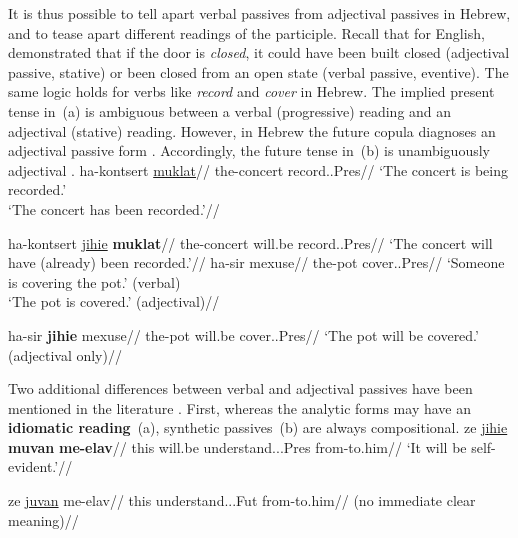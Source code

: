 It is thus possible to tell apart verbal passives from adjectival passives in Hebrew, and to tease apart different readings of the participle. Recall that for English, \cite{embick04li} demonstrated that if the door is \emph{closed}, it could have been built closed (adjectival passive, stative) or been closed from an open state (verbal passive, eventive). The same logic holds for verbs like \emph{record} and \emph{cover} in Hebrew. The implied present tense in~(\nextx a) is ambiguous between a verbal (progressive) reading and an adjectival (stative) reading. However, in Hebrew the future copula diagnoses an adjectival passive form \citep{doron00}. Accordingly, the future tense in~(\nextx b) is unambiguously adjectival \citep{doron00,horvathsiloni08,meltzerasscher11}.
\pex \label{ex:pres-ambig}
    \a \begingl
        \gla ha-kontsert \underline{muklat}//
        \glb the-concert record..Pres//
        \glft `The concert is being recorded.'\\`The concert has been recorded.'//
    \endgl
        
    \a \begingl
        \gla ha-kontsert \underline{jihie} \textbf{muklat}//
        \glb the-concert will.be record..Pres//
        \glft `The concert will have (already) been recorded.'//
    \endgl
\xe
\pex \label{ex:pres-ambig2}
    \a \begingl
        \gla{}ha-sir mexuse//
        \glb the-pot cover..Pres//
        \glft `Someone is covering the pot.' (verbal)\\`The pot is covered.' (adjectival)//
    \endgl
        
    \a \begingl
        \gla{}ha-sir \textbf{jihie} mexuse//
        \glb the-pot will.be cover..Pres//
        \glft `The pot will be covered.' (adjectival only)//
    \endgl
\xe

Two additional differences between verbal and adjectival passives have been mentioned in the literature \citep{horvathsiloni08,horvathsiloni09,meltzerasscher11,kastnerzu17}. First, whereas the analytic forms may have an \textbf{idiomatic reading}~(\nextx a), synthetic passives~(\nextx b) are always compositional.
\pex \label{ex:idiom}
    \a 
        \begingl
        \gla {}ze \underline{jihie} \textbf{muvan} \textbf{me-elav}//
        \glb this will.be understand...Pres from-to.him//
        \glft `It will be self-evident.'//
        \endgl

    \a \ljudge{\#}
        \begingl
        \gla {}ze \underline{juvan} me-elav//
        \glb this understand...Fut from-to.him//
        \glft (no immediate clear meaning)//
        \endgl
\xe

